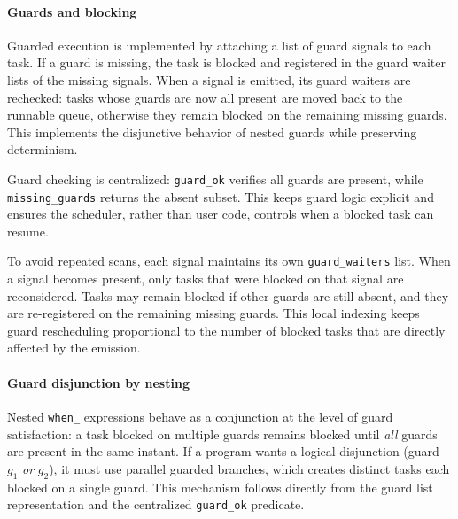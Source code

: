 \paragraph{Guards and blocking}
Guarded execution is implemented by attaching a list of guard signals to each
task. If a guard is missing, the task is blocked and registered in the guard
waiter lists of the missing signals. When a signal is emitted, its guard
waiters are rechecked: tasks whose guards are now all present are moved back to
the runnable queue, otherwise they remain blocked on the remaining missing
guards. This implements the disjunctive behavior of nested guards while
preserving determinism.

Guard checking is centralized: \texttt{guard\_ok} verifies all guards are
present, while \texttt{missing\_guards} returns the absent subset. This keeps
guard logic explicit and ensures the scheduler, rather than user code, controls
when a blocked task can resume.

To avoid repeated scans, each signal maintains its own \texttt{guard\_waiters}
list. When a signal becomes present, only tasks that were blocked on that
signal are reconsidered. Tasks may remain blocked if other guards are still
absent, and they are re-registered on the remaining missing guards. This local
indexing keeps guard rescheduling proportional to the number of blocked tasks
that are directly affected by the emission.

\paragraph{Guard disjunction by nesting}
Nested \texttt{when\_} expressions behave as a conjunction at the level of
guard satisfaction: a task blocked on multiple guards remains blocked until
\emph{all} guards are present in the same instant. If a program wants a logical
disjunction (guard $g_1$ \emph{or} $g_2$), it must use parallel guarded
branches, which creates distinct tasks each blocked on a single guard. This
mechanism follows directly from the guard list representation and the
centralized \texttt{guard\_ok} predicate.

